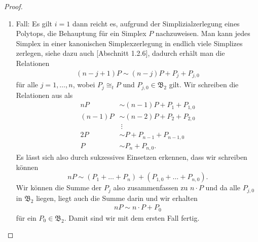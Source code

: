 \documentclass[11pt,titlepage]{article}
\theoremstyle{definition}
\theoremstyle{remark}
\begin{document}
	\begin{proof}
		\begin{enumerate}
			\item Fall: Es gilt $i=1$ dann reicht es, aufgrund 
			der Simplizialzerlegung eines Polytops, die 
			Behauptung für ein Simplex $P$ nachzuweisen. Man kann jedes 
			Simplex in einer kanonischen Simplexzerlegung in endlich 
			viele Simplizes zerlegen, 
			siehe dazu auch \cite{Hadwiger}[Abschnitt 1.2.6], dadurch erhält 
			man die Relationen
			\begin{align*}
				(n-j +1)P\sim(n-j )P+P_j+P_{j, 0} 
			\end{align*}
			für alle $j=1,\ldots,n$, wobei $P_{j}\cong_t P$ und 
			$P_{j, 0}\in\mathfrak{B}_2$ gilt. Wir schreiben die Relationen 
			aus als
			\begin{align*}
				nP &\sim (n-1)P+P_1+P_{1,0} \\
				(n-1)P &\sim (n-2)P+P_2 +P_{2,0} \\
				&\ \vdots \\
				2P &\sim P +P_{n-1}+P_{n-1,0} \\
				P&\sim P_n+ P_{n,0}.
			\end{align*}
			Es lässt sich also durch sukzessives Einsetzen erkennen, dass wir 
			schreiben können 
			\[nP\sim (P_1+\ldots+P_n)+(P_{1,0}+\ldots+P_{n,0}).\]
			Wir können die Summe der $P_{j}$ also zusammenfassen zu $n \cdot P$ 
			und da alle $P_{j,0}$ in $\mathfrak{B}_2$ liegen, liegt auch 
			die Summe darin und wir erhalten
			\begin{align}
				nP\sim n\cdot P+ P_0 \label{thm:zyl;1}
			\end{align}
			für ein $P_0\in\mathfrak{B}_2$. Damit sind wir mit dem 
			ersten Fall fertig.
			

\end{enumerate}
\end{proof}
\end{document}
